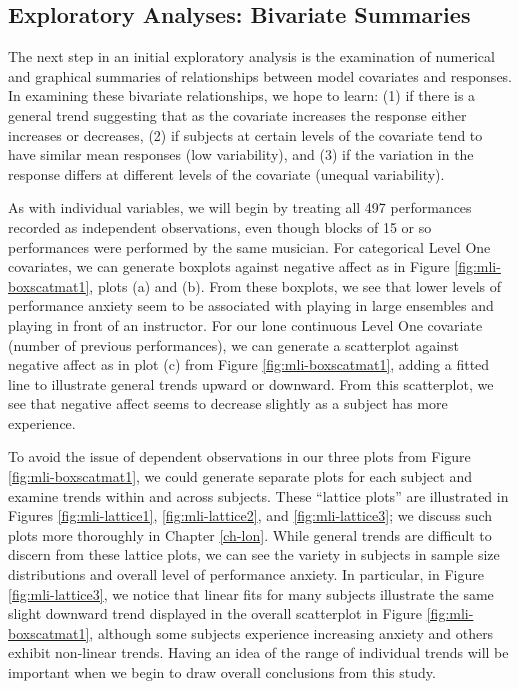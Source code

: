 \documentclass[
]{krantz}
\begin{document}
\hypertarget{explore2}{%
\subsection{Exploratory Analyses: Bivariate Summaries}\label{explore2}}

The next step in an initial exploratory analysis is the examination of numerical and graphical summaries of relationships between model covariates and responses. In examining these bivariate relationships, we hope to learn: (1) if there is a general trend suggesting that as the covariate increases the response either increases or decreases, (2) if subjects at certain levels of the covariate tend to have similar mean responses (low variability), and (3) if the variation in the response differs at different levels of the covariate (unequal variability).

As with individual variables, we will begin by treating all 497 performances recorded as independent observations, even though blocks of 15 or so performances were performed by the same musician. For categorical Level One covariates, we can generate boxplots against negative affect as in Figure \ref{fig:mli-boxscatmat1}, plots (a) and (b). From these boxplots, we see that lower levels of performance anxiety seem to be associated with playing in large ensembles and playing in front of an instructor. For our lone continuous Level One covariate (number of previous performances), we can generate a scatterplot against negative affect as in plot (c) from Figure \ref{fig:mli-boxscatmat1}, adding a fitted line to illustrate general trends upward or downward. From this scatterplot, we see that negative affect seems to decrease slightly as a subject has more experience.

To avoid the issue of dependent observations in our three plots from Figure \ref{fig:mli-boxscatmat1}, we could generate separate plots for each subject and examine trends within and across subjects. These ``lattice plots''  are illustrated in Figures \ref{fig:mli-lattice1}, \ref{fig:mli-lattice2}, and \ref{fig:mli-lattice3}; we discuss such plots more thoroughly in Chapter \ref{ch-lon}. While general trends are difficult to discern from these lattice plots, we can see the variety in subjects in sample size distributions and overall level of performance anxiety. In particular, in Figure \ref{fig:mli-lattice3}, we notice that linear fits for many subjects illustrate the same slight downward trend displayed in the overall scatterplot in Figure \ref{fig:mli-boxscatmat1}, although some subjects experience increasing anxiety and others exhibit non-linear trends. Having an idea of the range of individual trends will be important when we begin to draw overall conclusions from this study.
\end{document}
